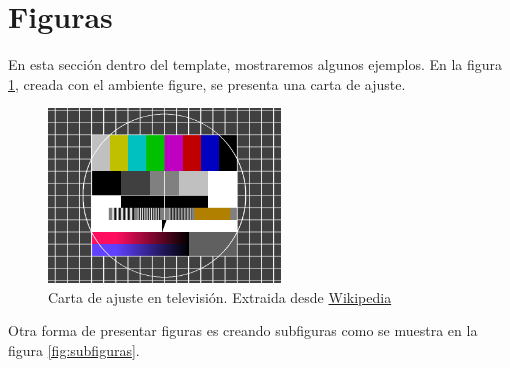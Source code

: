 \section{Figuras}

En esta sección dentro del template, mostraremos algunos ejemplos. En la figura \ref{fig:ejemplo}, creada con el ambiente figure, se presenta una carta de ajuste.

\begin{figure}[htb]
    \centering
    \includegraphics[width=0.55\textwidth,keepaspectratio]{content/images/testimage.png}
    \caption{Carta de ajuste en televisión. Extraida desde \href{https://es.wikipedia.org/wiki/Carta_de_ajuste}{Wikipedia}}
    \label{fig:ejemplo}
\end{figure}


Otra forma de presentar figuras es creando subfiguras como se muestra en la figura \ref{fig:subfiguras}.

